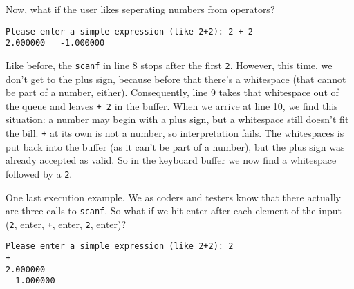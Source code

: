 Now, what if the user likes seperating numbers from operators?
\begin{cmdbox}
\begin{verbatim}
Please enter a simple expression (like 2+2): 2 + 2
2.000000   -1.000000
\end{verbatim}
\end{cmdbox}

Like before, the \texttt{scanf} in line 8 stops after the first \texttt{2}. However, this time, we don't get to the plus sign, because before that there's a whitespace (that cannot be part of a number, either). Consequently, line 9 takes that whitespace out of the queue and leaves \texttt{+ 2} in the buffer. When we arrive at line 10, we find this situation: a number may begin with a plus sign, but a whitespace still doesn't fit the bill. \texttt{+} at its own is not a number, so interpretation fails. The whitespaces is put back into the buffer (as it can't be part of a number), but the plus sign was already accepted as valid. So in the keyboard buffer we now find a whitespace followed by a \texttt{2}.

One last execution example. We as coders and testers know that there actually are three calls to \texttt{scanf}. So what if we hit enter after each element of the input (\texttt{2}, enter, \texttt{+}, enter, \texttt{2}, enter)?

\begin{cmdbox}
\begin{verbatim}
Please enter a simple expression (like 2+2): 2
+ 
2.000000 
 -1.000000
\end{verbatim}
\end{cmdbox}

